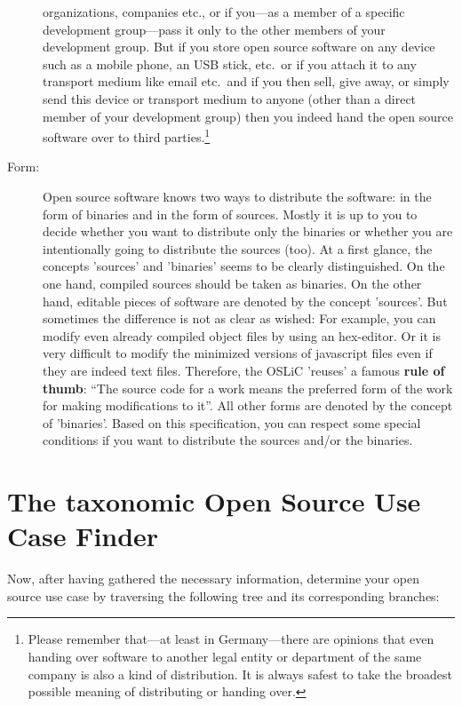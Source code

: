 \begin{description}
organizations, companies etc., or if you---as a member of a specific
development group---pass it only to the other members of your development
group. But if you store open source software on any device such as a mobile
phone, an USB stick, etc.\ or if you attach it to any transport medium like
email etc.\ and if you then sell, give away, or simply send this device or
transport medium to anyone (other than a direct member of your development
group) then you indeed hand the open source software over to third
parties.\footnote{Please remember that---at least in Germany---there are
opinions that even handing over software to another legal entity or department
of the same company is also a kind of distribution. It is always safest to take
the broadest possible meaning of distributing or handing over.}
\item[Form:] Open source software knows two ways to distribute the software: in
the form of binaries and in the form of sources. Mostly it is up to you to
decide whether you want to distribute only the binaries or whether you are
intentionally going to distribute the sources (too). At a first glance, the
concepts 'sources' and 'binaries' seems to be clearly distinguished.
On the one hand, compiled sources should be taken as binaries. On the other
hand, editable pieces of software are denoted by the concept 'sources'. But
sometimes the difference is not as clear as wished: For example, you can modify
even already compiled object files by using an hex-editor. Or it is very
difficult to modify the minimized versions of javascript files even if they are
indeed text files. Therefore, the OSLiC 'reuses' a famous \textbf{rule of
thumb}: \enquote{The source code for a work means the preferred form of the work
for making modifications to it}. All other forms are denoted by
the concept of 'binaries'. Based on this specification, you can respect some
special conditions if you want to distribute the sources and/or the binaries.
\end{description}

\section{The taxonomic Open Source Use Case Finder}

Now, after having gathered the necessary information, determine your 
open source use case by traversing the following tree and its corresponding
branches:

